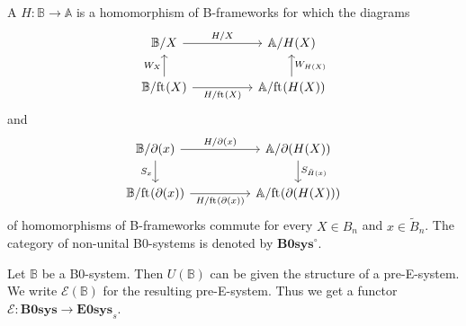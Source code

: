 \begin{defn}
A  $H:\mathbb{B}\to\mathbb{A}$ is a homomorphism of B-frameworks
for which the diagrams
\begin{equation*}
\begin{tikzcd}[column sep=huge]
\mathbb{B}/X \arrow[r,"H/X"] & \mathbb{A}/H(X) \\
\mathbb{B}/\eft(X) \arrow[u,"W_X"] \arrow[r,swap,"H/\eft(X)"] & \mathbb{A}/\eft(H(X)) \arrow[u,swap,"W_{H(X)}"]
\end{tikzcd}
\end{equation*}
and
\begin{equation*}
\begin{tikzcd}[column sep=huge]
\mathbb{B}/\ebd(x) \arrow[r,"H/\ebd(x)"] \arrow[d,swap,"S_x"] & \mathbb{A}/\ebd(H(X)) \arrow[d,"S_{\tilde{H}(x)}"] \\
\mathbb{B}/\eft(\ebd(x)) \arrow[r,swap,"H/\eft(\ebd(x))"] & \mathbb{A}/\eft(\ebd(H(X)))
\end{tikzcd}
\end{equation*}
of homomorphisms of B-frameworks commute for every 
$X\in B_n$ and $x\in\tilde{B}_n$. The category of non-unital B0-systems is denoted
by $\mathbf{B0sys}^\circ$.
\end{defn}

\begin{defn}
Let $\mathbb{B}$ be a B0-system. Then $U(\mathbb{B})$ can be given the structure
of a pre-E-system. We write $\mathcal{E}(\mathbb{B})$ for the resulting
pre-E-system. Thus we get a functor $\mathcal{E}:\mathbf{B0sys}\to\mathbf{E0sys}_s$.
\end{defn}

